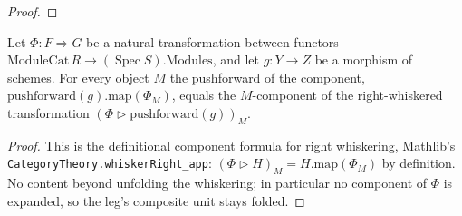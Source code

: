 \begin{lemma}
\begin{proof}
  \end{proof}
\end{lemma}


\begin{lemma}
  \label{lem:ring_square_glue_whiskerRight_lift}
  Let \(\Phi : F \Rightarrow G\) be a natural transformation between functors
  \(\mathrm{ModuleCat}\,R \to (\operatorname{Spec} S).\mathrm{Modules}\), and let \(g : Y \to Z\) be a
  morphism of schemes. For every object \(M\) the pushforward of the component,
  \(\mathrm{pushforward}(g).\mathrm{map}(\Phi_M)\), equals the \(M\)-component of the right-whiskered
  transformation \((\Phi \rhd \mathrm{pushforward}(g))_M\).
  \begin{proof}
    This is the definitional component formula for right whiskering, Mathlib's
    \texttt{CategoryTheory.whiskerRight\_app}: \((\Phi \rhd H)_M = H.\mathrm{map}(\Phi_M)\) by
    definition. No content beyond unfolding the whiskering; in particular no component of \(\Phi\) is
    expanded, so the leg's composite unit stays folded.
  \end{proof}
\end{lemma}

